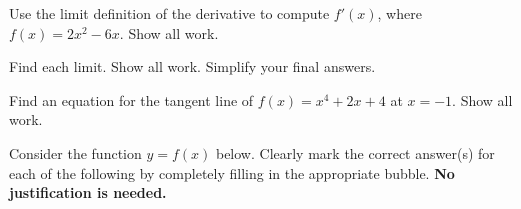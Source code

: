 \documentclass[addpoints,12pt]{exam}
\begin{document}
\begin{questions}

\vspace{2in}

\newpage

\question[11] Use the limit definition of the derivative to compute $f'(x)$, where $f(x)=2x^2-6x$.
Show all work.


\newpage

\question

Find each limit. Show all work. Simplify your final answers.


\newpage


\question[10] Find an equation for the tangent line of $f(x)=x^4+2x+4$ at $x=-1$. Show all work.


\newpage




\question Consider the function $y=f(x)$ below. Clearly mark the correct answer(s) for each of
the following by completely filling in the appropriate bubble. \textbf{No justification is needed.}


\end{questions}
\end{document}
